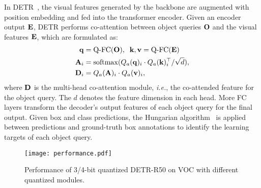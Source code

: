 \documentclass[10pt,twocolumn,letterpaper]{article}
\begin{document}
%
In DETR~\cite{carion2020end}, the visual features generated by the backbone are augmented with position embedding and fed into the transformer encoder.
% 
% 
Given an encoder output ${\bf E}$, DETR performs co-attention between object queries ${\bf O}$ and the visual features ${\bf E}$, which are formulated as:
%
\begin{equation}
    \begin{aligned}
    {\bf q} &= \operatorname{Q-FC}({\bf O}),\;\;{\bf k},{\bf v} = \operatorname{Q-FC}({\bf E})\\
    {\bf A}_i &= \operatorname{softmax}(Q_a({\bf q})_i \cdot Q_a({\bf k})_i^{\top}/\sqrt{d}), \\
    {\bf D}_i &= Q_a({\bf A})_i\cdot Q_a({\bf v})_i,
    \end{aligned}
    \label{decoder}
\end{equation}
%
where ${\bf D}$ is the multi-head co-attention module, {\em i.e.}, the co-attended feature for the object query. The $d$ denotes the feature dimension in each head.
%
More FC layers transform the decoder's output features of each object query for the final output. Given box and class predictions, the Hungarian algorithm~\cite{carion2020end} is applied between predictions and ground-truth box annotations to identify the learning targets of each object query. 

\begin{figure}[t]
\centering
\texttt{[image: performance.pdf]}
%
\caption{Performance of 3/4-bit quantized DETR-R50 on VOC with different quantized modules.}
\label{fig:quantization}
\end{figure}
\end{document}
